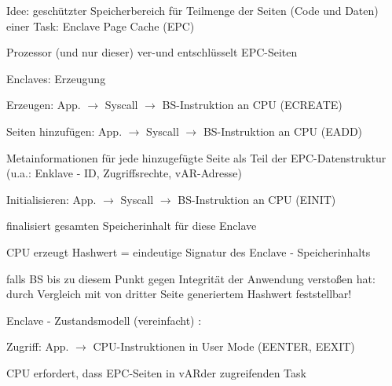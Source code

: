 \documentclass[a4paper]{article}
\begin{document}
\begin{multicols}{3}
    \begin{itemize*}
        \item
        Idee: geschützter Speicherbereich für Teilmenge der Seiten (Code und
        Daten) einer Task: Enclave Page Cache (EPC)
        \item
        Prozessor (und nur dieser) ver-und entschlüsselt EPC-Seiten
        \item
        Enclaves: Erzeugung
        \begin{itemize*}
            \item Erzeugen: App. $\rightarrow$ Syscall $\rightarrow$ BS-Instruktion an CPU (ECREATE)
            \item Seiten hinzufügen: App. $\rightarrow$ Syscall $\rightarrow$ BS-Instruktion an CPU (EADD) \begin{itemize*} \item Metainformationen für jede hinzugefügte Seite als Teil der EPC-Datenstruktur (u.a.: Enklave - ID, Zugriffsrechte, vAR-Adresse) \end{itemize*}
            \item Initialisieren: App. $\rightarrow$ Syscall $\rightarrow$ BS-Instruktion an CPU (EINIT) \begin{itemize*} \item finalisiert gesamten Speicherinhalt für diese Enclave \item CPU erzeugt Hashwert = eindeutige Signatur des Enclave - Speicherinhalts \item falls BS bis zu diesem Punkt gegen Integrität der Anwendung verstoßen hat: durch Vergleich mit von dritter Seite generiertem Hashwert feststellbar! \end{itemize*}
        \end{itemize*}
        \item
        Enclave - Zustandsmodell (vereinfacht) :
        \item
        Zugriff: App. $\rightarrow$ CPU-Instruktionen in User
        Mode (EENTER, EEXIT)
        \begin{itemize*}
            \item CPU erfordert, dass EPC-Seiten in vARder zugreifenden Task
        \end{itemize*}
    \end{itemize*}



\end{multicols}
\end{document}
